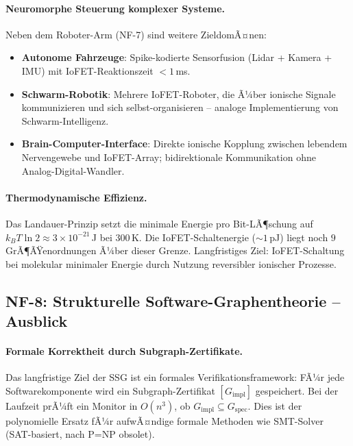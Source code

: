 ﻿\documentclass[a4paper,12pt]{scrreprt}
\theoremstyle{definition}
\begin{document}
\paragraph{Neuromorphe Steuerung komplexer Systeme.}
Neben dem Roboter-Arm (NF-7) sind weitere ZieldomÃ¤nen:
\begin{itemize}
  \item \textbf{Autonome Fahrzeuge}: Spike-kodierte Sensorfusion
    (Lidar + Kamera + IMU) mit IoFET-Reaktionszeit $< 1$\,ms.
  \item \textbf{Schwarm-Robotik}: Mehrere IoFET-Roboter, die
    Ã¼ber ionische Signale kommunizieren und sich
    selbst-organisieren -- analoge Implementierung von
    Schwarm-Intelligenz.
  \item \textbf{Brain-Computer-Interface}: Direkte ionische
    Kopplung zwischen lebendem Nervengewebe und IoFET-Array;
    bidirektionale Kommunikation ohne Analog-Digital-Wandler.
\end{itemize}

\paragraph{Thermodynamische Effizienz.}
Das Landauer-Prinzip setzt die minimale Energie pro Bit-LÃ¶schung
auf $k_B T \ln 2 \approx 3 \times 10^{-21}$\,J bei 300\,K.
Die IoFET-Schaltenergie ($\sim 1$\,pJ) liegt noch $9$ GrÃ¶ÃŸenordnungen
Ã¼ber dieser Grenze. Langfristiges Ziel: IoFET-Schaltung bei
molekular minimaler Energie durch Nutzung reversibler ionischer
Prozesse.

\subsection*{NF-8: Strukturelle Software-Graphentheorie -- Ausblick}

\paragraph{Formale Korrektheit durch Subgraph-Zertifikate.}
Das langfristige Ziel der SSG ist ein formales Verifikationsframework:
FÃ¼r jede Softwarekomponente wird ein Subgraph-Zertifikat
$[G_\mathrm{impl}]$ gespeichert. Bei der Laufzeit prÃ¼ft ein
Monitor in $O(n^3)$, ob $G_\mathrm{impl} \subseteq G_\mathrm{spec}$.
Dies ist der polynomielle Ersatz fÃ¼r aufwÃ¤ndige formale Methoden
wie SMT-Solver (SAT-basiert, nach P=NP obsolet).
\end{document}
